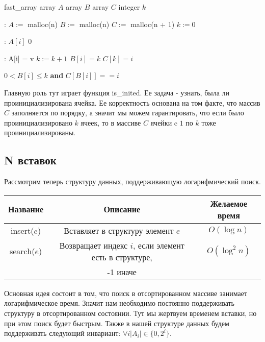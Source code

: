 \documentclass[../main.tex]{subfiles}
\begin{document}
	\begin{struct}{fast\_array}
		\State array $A$
		\State array $B$
		\State array $C$
		\State integer $k$
		
		:
			\State $A := $ malloc(n)
			\State $B := $ malloc(n)
			\State $C := $ malloc(n + 1)
			\State $k := 0$
		\EndFunction
		
		:
				\State \Return $A[i]$
			\Else
				\State \Return $0$
			\EndIf
		\EndFunction
		
		:
			\State A[i] = v
				\State $k := k + 1$
				\State $B[i] = k$
				\State $C[k] = i$
			\EndIf
		\EndFunction
		
		\Function{is\_inited}{i}
			\State \Return $0 < B[i] \leqslant k$ \textbf{and} $C[B[i]] == i$
		\EndFunction
	\end{struct}
	
	Главную роль тут играет функция is\_inited. Ее задача - узнать, была ли проинициализирована ячейка. Ее корректность основана на том факте, что массив $C$ заполняется по порядку, а значит мы можем гарантировать, что если было проинициализировано $k$ ячеек, то в массиве $C$ ячейки c $1$ по $k$ тоже проинициализированы. %
		
	\subsection{N вставок}
	
	Рассмотрим теперь структуру данных, поддерживающую логарифмический поиск.
	
	\begin{center}
		\begin{tabular}{c|c|c}
			Название 		& Описание 											& Желаемое время\\ \hline
			insert($e$) 	& Вставляет в структуру элемент $e$	 			& $O(\log n)$ 			\\
			search($e$)  	& Возвращает индекс $i$, если элемент есть в структуре,  & $O(\log^2n)$			\\
							&-1 иначе
		\end{tabular}
	\end{center} %
	
	Основная идея состоит в том, что поиск в отсортированном массиве занимает логарифмическое время. Значит нам необходимо постоянно поддерживать структуру в отсортированном состоянии. Тут мы жертвуем временем вставки, но при этом поиск будет быстрым. Также в нашей структуре данных будем поддерживать следующий инвариант: %
	$\forall i |A_i| \in \{0, 2^i\}$.
	
\end{document}
